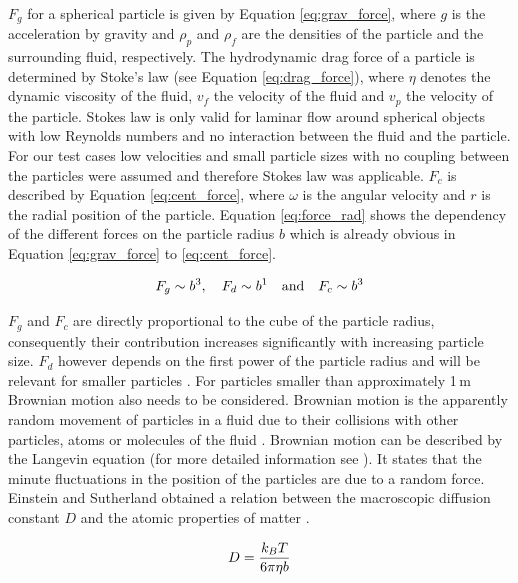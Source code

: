 $F_{g}$ for a spherical particle is given by Equation \ref{eq:grav_force}, where $g$ is the acceleration by gravity and $\rho_{p}$ and $\rho_{f}$ are the densities of the particle and the surrounding fluid, respectively. The hydrodynamic drag force of a particle is determined by Stoke's law (see Equation \ref{eq:drag_force}), where $\eta$ denotes the dynamic viscosity of the fluid, $v_{f}$ the velocity of the fluid and $v_{p}$ the velocity of the particle. Stokes law is only valid for laminar flow around spherical objects with low Reynolds numbers and no interaction between the fluid and the particle. For our test cases low velocities and small particle sizes with no coupling between the particles were assumed and therefore Stokes law was applicable. $F_{c}$ is described by Equation \ref{eq:cent_force}, where $\omega$ is the angular velocity and $r$ is the radial position of the particle. Equation \ref{eq:force_rad} shows the dependency of the different forces on the particle radius $b$ which is already obvious in Equation \ref{eq:grav_force} to \ref{eq:cent_force}. 

\begin{equation}
\label{eq:force_rad}
\centering
F_{g}\sim b^{3}, \quad F_{d}\sim b^{1} \quad \textrm{and} \quad F_{c}\sim b^{3}
\end{equation}

$F_{g}$ and $F_{c}$ are directly proportional to the cube of the particle radius, consequently their contribution increases significantly with increasing particle size. $F_{d}$ however depends on the first power of the particle radius and will be relevant for smaller particles \cite{svoboda2004magnetic}\cite{oberteuffer1974magnetic}. For particles smaller than approximately 1\,\textmu m Brownian motion also needs to be considered. Brownian motion is the apparently random movement of particles in a fluid due to their collisions with other particles, atoms or molecules of the fluid \cite{brown1828xxvii}. Brownian motion can be described by the   
Langevin equation (for more detailed information see \cite{Langevin}\cite{BrownianDynamics} \cite{BrownianModel}). It states that the minute fluctuations in the position of the particles are due to a random force. Einstein and Sutherland obtained a relation between the macroscopic diffusion constant $D$ and the atomic properties of matter \cite{einstein1906theorie}\cite{einstein1905molekularkinetischen}\cite{sutherland1905lxxv}. 

\begin{equation}
\label{eq:Stokes_Einstein}
\centering
D = \frac{k_{B}T}{6\pi\eta b}
\end{equation}

